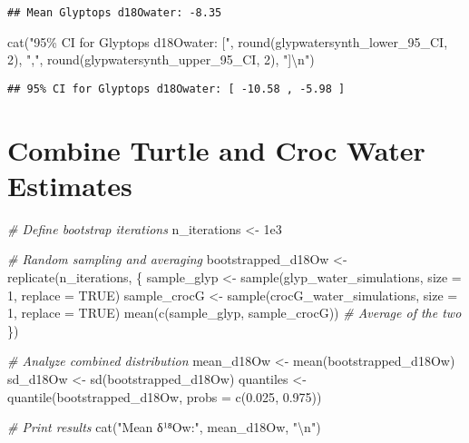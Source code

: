 \documentclass[
]{article}
\newenvironment{Shaded}{\begin{snugshade}}{\end{snugshade}}
\newcommand{\AttributeTok}[1]{\textcolor[rgb]{0.77,0.63,0.00}{#1}}
\newcommand{\CommentTok}[1]{\textcolor[rgb]{0.56,0.35,0.01}{\textit{#1}}}
\newcommand{\ConstantTok}[1]{\textcolor[rgb]{0.00,0.00,0.00}{#1}}
\newcommand{\DecValTok}[1]{\textcolor[rgb]{0.00,0.00,0.81}{#1}}
\newcommand{\FloatTok}[1]{\textcolor[rgb]{0.00,0.00,0.81}{#1}}
\newcommand{\FunctionTok}[1]{\textcolor[rgb]{0.00,0.00,0.00}{#1}}
\newcommand{\NormalTok}[1]{#1}
\newcommand{\OtherTok}[1]{\textcolor[rgb]{0.56,0.35,0.01}{#1}}
\newcommand{\SpecialCharTok}[1]{\textcolor[rgb]{0.00,0.00,0.00}{#1}}
\newcommand{\StringTok}[1]{\textcolor[rgb]{0.31,0.60,0.02}{#1}}
\begin{document}
\begin{verbatim}
## Mean Glyptops d18Owater: -8.35
\end{verbatim}

\begin{Shaded}
\begin{Highlighting}[]
\FunctionTok{cat}\NormalTok{(}\StringTok{"95\% CI for Glyptops d18Owater: ["}\NormalTok{, }\FunctionTok{round}\NormalTok{(glypwatersynth\_lower\_95\_CI, }\DecValTok{2}\NormalTok{), }\StringTok{","}\NormalTok{, }\FunctionTok{round}\NormalTok{(glypwatersynth\_upper\_95\_CI, }\DecValTok{2}\NormalTok{), }\StringTok{"]}\SpecialCharTok{\textbackslash{}n}\StringTok{"}\NormalTok{)}
\end{Highlighting}
\end{Shaded}

\begin{verbatim}
## 95% CI for Glyptops d18Owater: [ -10.58 , -5.98 ]
\end{verbatim}

\hypertarget{combine-turtle-and-croc-water-estimates}{%
\section{Combine Turtle and Croc Water
Estimates}\label{combine-turtle-and-croc-water-estimates}}

\begin{Shaded}
\begin{Highlighting}[]
\CommentTok{\# Define bootstrap iterations}
\NormalTok{n\_iterations }\OtherTok{\textless{}{-}} \FloatTok{1e3}

\CommentTok{\# Random sampling and averaging}
\NormalTok{bootstrapped\_d18Ow }\OtherTok{\textless{}{-}} \FunctionTok{replicate}\NormalTok{(n\_iterations, \{}
\NormalTok{  sample\_glyp }\OtherTok{\textless{}{-}} \FunctionTok{sample}\NormalTok{(glyp\_water\_simulations, }\AttributeTok{size =} \DecValTok{1}\NormalTok{, }\AttributeTok{replace =} \ConstantTok{TRUE}\NormalTok{)}
\NormalTok{  sample\_crocG }\OtherTok{\textless{}{-}} \FunctionTok{sample}\NormalTok{(crocG\_water\_simulations, }\AttributeTok{size =} \DecValTok{1}\NormalTok{, }\AttributeTok{replace =} \ConstantTok{TRUE}\NormalTok{)}
  \FunctionTok{mean}\NormalTok{(}\FunctionTok{c}\NormalTok{(sample\_glyp, sample\_crocG))  }\CommentTok{\# Average of the two}
\NormalTok{\})}

\CommentTok{\# Analyze combined distribution}
\NormalTok{mean\_d18Ow }\OtherTok{\textless{}{-}} \FunctionTok{mean}\NormalTok{(bootstrapped\_d18Ow)}
\NormalTok{sd\_d18Ow }\OtherTok{\textless{}{-}} \FunctionTok{sd}\NormalTok{(bootstrapped\_d18Ow)}
\NormalTok{quantiles }\OtherTok{\textless{}{-}} \FunctionTok{quantile}\NormalTok{(bootstrapped\_d18Ow, }\AttributeTok{probs =} \FunctionTok{c}\NormalTok{(}\FloatTok{0.025}\NormalTok{, }\FloatTok{0.975}\NormalTok{))}

\CommentTok{\# Print results}
\FunctionTok{cat}\NormalTok{(}\StringTok{"Mean δ¹⁸Ow:"}\NormalTok{, mean\_d18Ow, }\StringTok{"}\SpecialCharTok{\textbackslash{}n}\StringTok{"}\NormalTok{)}
\end{Highlighting}
\end{Shaded}
\end{document}
